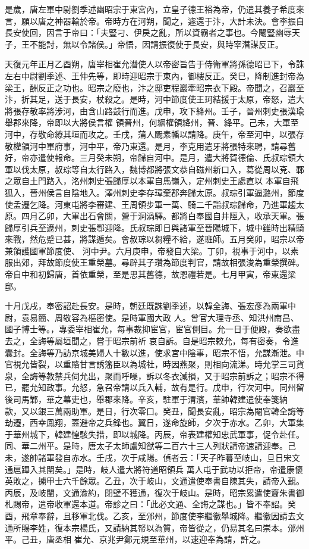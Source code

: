 \begin{pinyinscope}
 是歲，唐左軍中尉劉季述幽昭宗于東宮內，立皇子德王裕為帝，仍遣其養子希度來言，願以唐之神器輸於帝。帝時方在河朔，聞之，遽還于汴，大計未決。會李振自長安使回，因言于帝曰：「夫豎刁、伊戾之亂，所以資霸者之事也。今閹豎幽辱天子，王不能討，無以令諸侯。」帝悟，因請振復使于長安，與時宰潛謀反正。



 天復元年正月乙酉朔，唐宰相崔允潛使人以帝密旨告于侍衛軍將孫德昭已下，令誅左右中尉劉季述、王仲先等，即時迎昭宗于東內，御樓反正。癸巳，降制進封帝為梁王，酬反正之功也。昭宗之廢也，汴之邸吏程巖牽昭宗衣下殿。帝聞之，召巖至汴，折其足，送于長安，杖殺之。是時，河中節度使王珂結援于太原，帝怒，遣大將張存敬率將涉河，由含山路鼓行而進。戊申，攻下絳州。壬子，晉州刺史張漢瑜舉郡來降，帝即以大將侯言權
 領晉州，何絪權領絳州，晉、絳平。己未，大軍至河中，存敬命繚其垣而攻之。壬戌，蒲人颺素幡以請降。庚午，帝至河中，以張存敬權領河中軍府事，河中平，帝乃東還。是月，李克用遣牙將張特來聘，請尋舊好，帝亦遣使報命。三月癸未朔，帝歸自河中。是月，遣大將賀德倫、氏叔琮領大軍以伐太原，叔琮等自太行路入，魏博都將張文恭自磁州新口入，葛從周以兗、鄆之眾自土門路入，洺州刺史張歸厚以本軍自馬嶺入，定州刺史王處直以
 本軍自飛狐入，晉州侯言自陰地入。澤州刺史李存璋棄郡奔歸太原。叔琮引軍逼潞州，節度使孟遷乞降。河東屯將李審建、王周領步軍一萬、騎二千詣叔琮歸命，乃進軍趨太原。四月乙卯，大軍出石會關，營于洞渦驛。都將白奉國自井陘入，收承天軍。張歸厚引兵至遼州，刺史張鄂迎降。氏叔琮即日與諸軍至晉陽城下，城中雖時出精騎來戰，然危蹙已甚，將謀遁矣。會叔琮以芻糧不給，遂班師。五月癸卯，昭宗以帝兼領護國軍節度使、
 河中尹。六月庚申，帝發自大梁。丁卯，視事于河中，以素服出郊，拜故節度使王重榮墓。尋辟其子瓚為節度判官，請故相張浚為重榮撰碑。帝自中和初歸唐，首依重榮，至是思其舊德，故恩禮若是。七月甲寅，帝東還梁邸。


十月戊戌，奉密詔赴長安。是時，朝廷既誅劉季述，以韓全誨、張宏彥為兩軍中尉，袁易簡、周敬容為樞密使。是時軍國大政
 人。曾官大理寺丞、知洪州南昌、國子博士等。，專委宰相崔允，每事裁抑宦官，宦官側目。允一日于便殿，奏欲盡去之，全誨等屬垣聞之，嘗于昭宗前祈
 哀自訴。自是昭宗敕允，每有密奏，令進囊封。全誨等乃訪京城美婦人十數以進，使求宮中陰事，昭宗不悟，允謀漸泄。中官視允皆裂，以重賂甘言誘籓臣以為城社，時因燕聚，則相向流涕。時允掌三司貨泉，全誨等教禁兵伺允出，聚而呼噪，訴以冬衣減損，又于昭宗前訴之；昭宗不得已，罷允知政事。允怒，急召帝請以兵入輔，故有是行。戊申，行次河中。同州留後司馬鄴，華之幕吏也，舉郡來降。辛亥，駐軍于渭濱，華帥韓建遣使奉箋納
 款，又以銀三萬兩助軍。是日，行次零口。癸丑，聞長安亂，昭宗為閹官韓全誨等劫遷，西幸鳳翔，蓋避帝之兵鋒也。翼日，遂命旋師，夕次于赤水。乙卯，大軍集于華州城下，韓建惶駭失措，即以城降。丙辰，帝表建權知忠武軍事，促令赴任。同、華二州平。是時，唐太子太師盧知猷等二百六十三人列狀請帝速請迎奉。己未，遂帥諸軍發自赤水。壬戌，次于咸陽。偵者云：「天子昨暮至岐山，旦日宋文通扈蹕入其闉矣。」是時，岐人遣大將符道昭領兵
 萬人屯于武功以拒帝，帝遣康懷英敗之，擄甲士六千餘眾。乙丑，次于岐山，文通遣使奉書自陳其失，請帝入覲。丙辰，及岐闉，文通渝約，閉壁不獲通，復次于岐山。是時，昭宗累遣使齎朱書御札賜帝，遣帝收軍還本道。帝診之曰：「此必文通、全誨之謀也。」皆不奉詔。癸酉，飛章奉辭，且移軍北伐。乙亥，至邠州，節度使李繼徽舉城降。繼徽因請去文通所賜李姓，復本宗楊氏，又請納其帑以為質，帝皆從之，仍易其名曰崇本。邠州平。己丑，唐丞相
 崔允、京兆尹鄭元規至華州，以速迎奉為請，許之。



\end{pinyinscope}
